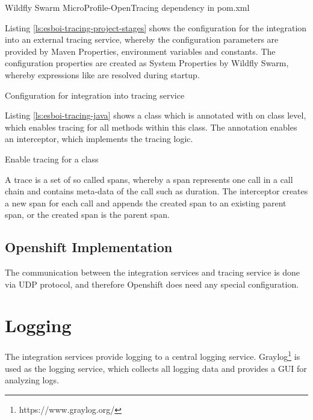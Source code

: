 \begin{listing}
	\caption{Wildfly Swarm MicroProfile-OpenTracing dependency in pom.xml}
	\label{ls:esboi-tracing-pom}
\end{listing}

Listing \vref{ls:esboi-tracing-project-stages} shows the configuration for the integration into an external tracing service, whereby the configuration parameters are provided by Maven Properties, environment variables and constants. The configuration properties are created as System Properties by Wildfly Swarm, whereby  expressions like  are resolved during startup.

\begin{listing}
	\caption{Configuration for integration into tracing service}
	\label{ls:esboi-tracing-project-stages}
\end{listing}

Listing \vref{ls:esboi-tracing-java} shows a class which is annotated with  on class level, which enables tracing for all methods within this class. The annotation  enables an interceptor, which implements the tracing logic. 

\begin{listing}
	\caption{Enable tracing for a class}
	\label{ls:esboi-tracing-java}
\end{listing}

A trace is a set of so called spans, whereby a span represents one call in a call chain and contains meta-data of the call such as duration. The interceptor creates a new span for each call and appends the created span to an existing parent span, or the created span is the parent span. 

\subsection{Openshift Implementation}
\label{sec:esbi-tracing-openshift}
The communication between the integration services and tracing service is done via UDP protocol, and therefore Openshift does need any special configuration.

\section{Logging}
\label{sec:esbi-logging}
The integration services provide logging to a central logging service. Graylog\footnote{https://www.graylog.org/} is used as the logging service, which collects all logging data and provides a GUI for analyzing logs.

